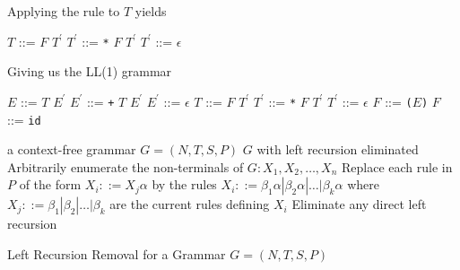 \documentclass[8pt,a4paper,compress,handout]{beamer}
\newcommand{\mm}[1]{$#1$}
\newcommand{\expo}[2]{$#1^{#2}$}
\newenvironment{spaced}
{
\smallskip
\hspace{.5cm}
\begin{minipage}[c]{\textwidth}
}
{
\end{minipage}
\smallskip
}
\begin{document}
\begin{frame}[fragile]
\pause

Applying the rule to $T$ yields

\text{ }
\begin{spaced}
\begin{production}
\mm{T}  ::= \mm{F} \expo{T}{\prime}
\expo{T}{\prime} ::= \lstinline{*} \mm{F} \expo{T}{\prime}
\expo{T}{\prime} ::= \mm{\epsilon}
\end{production}
\end{spaced}

\pause

Giving us the LL(1) grammar

\text{ }
\begin{spaced}
\begin{production}
\mm{E}  ::= \mm{T} \expo{E}{\prime}
\expo{E}{\prime} ::= \lstinline{+} \mm{T} \expo{E}{\prime}
\expo{E}{\prime} ::= \mm{\epsilon}
\mm{T}  ::= \mm{F} \expo{T}{\prime}
\expo{T}{\prime} ::= \lstinline{*} \mm{F} \expo{T}{\prime}
\expo{T}{\prime} ::= \mm{\epsilon}
\mm{F}  ::= \lstinline{(}\mm{E}\lstinline{)}
\mm{F}  ::= \lstinline{id}
\end{production}
\end{spaced}
\end{frame}

\begin{frame}[fragile]
\pause

\begin{algorithm}[H]
\begin{algorithmic}
\REQUIRE a context-free grammar $G=(N,T,S,P)$
\ENSURE $G$ with left recursion eliminated
\STATE Arbitrarily enumerate the non-terminals of $G: X_1, X_2, \dots, X_n$
\STATE Replace each rule in $P$ of the form $X_i::= X_j\alpha$ by the rules $X_i ::= \beta_1\alpha | \beta_2\alpha | \dots | \beta_k\alpha$ where $X_j ::= \beta_1 | \beta_2 | \dots | \beta_k$ are the current rules defining $X_i$
\STATE Eliminate any direct left recursion
\ENDFOR
\ENDFOR
\end{algorithmic}
\caption{Left Recursion Removal for a Grammar $G=(N,T,S,P)$}
\end{algorithm}
\end{frame}
\end{document}
